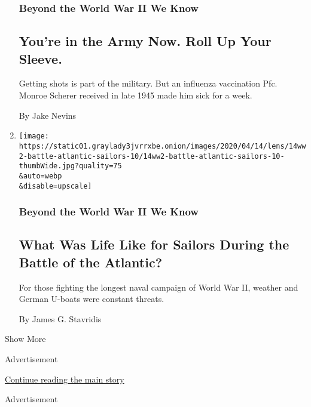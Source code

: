 \begin{enumerate}
{  \subsubsection{Beyond the World War II We
  Know}\label{beyond-the-world-war-ii-we-know-12}}

  \hypertarget{youre-in-the-army-now-roll-up-your-sleeve}{%
  \subsection{You're in the Army Now. Roll Up Your
  Sleeve.}\label{youre-in-the-army-now-roll-up-your-sleeve}}

  Getting shots is part of the military. But an influenza vaccination
  Pfc. Monroe Scherer received in late 1945 made him sick for a week.

  By Jake Nevins
\item
  \href{/2020/04/14/magazine/world-war-ii-battle-of-atlantic-sailors.html}{}

  \texttt{[image: https://static01.graylady3jvrrxbe.onion/images/2020/04/14/lens/14ww2-battle-atlantic-sailors-10/14ww2-battle-atlantic-sailors-10-thumbWide.jpg?quality=75\\\&auto=webp\\\&disable=upscale]}

  \hypertarget{beyond-the-world-war-ii-we-know-13}{%
  \subsubsection{Beyond the World War II We
  Know}\label{beyond-the-world-war-ii-we-know-13}}

  \hypertarget{what-was-life-like-for-sailors-during-the-battle-of-the-atlantic}{%
  \subsection{What Was Life Like for Sailors During the Battle of the
  Atlantic?}\label{what-was-life-like-for-sailors-during-the-battle-of-the-atlantic}}

  For those fighting the longest naval campaign of World War II, weather
  and German U-boats were constant threats.

  By James G. Stavridis
\end{enumerate}

Show More

Advertisement

\protect\hyperlink{after-mid1}{Continue reading the main story}

Advertisement

